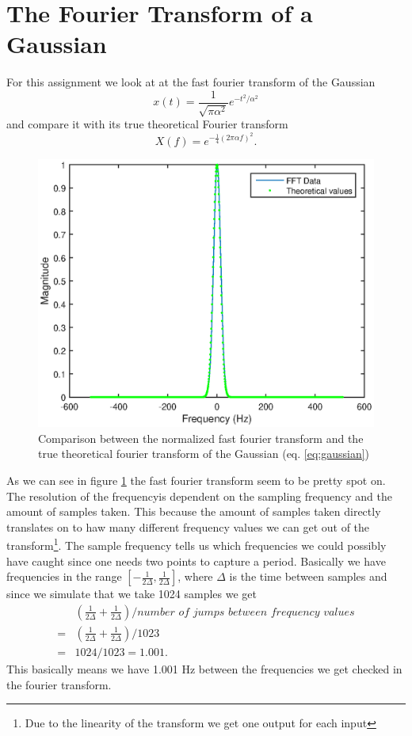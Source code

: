 \documentclass[11pt]{article}
\begin{document}
\section{The Fourier Transform of a Gaussian}
For this assignment we look at at the fast fourier transform of the Gaussian 
\begin{equation}
	x(t) = \frac{1}{\sqrt{\pi \alpha^2}} e^{-t^2/\alpha^2}
	\label{eq:gaussian}
\end{equation}
and compare it with its true theoretical Fourier transform
\begin{equation}
	X(f) = e^{-\frac{1}{4} (2 \pi \alpha f)^2}.
	\label{eq:guassianFFT}
\end{equation}
\begin{figure}[H]
	\centering
	\includegraphics[width=1\textwidth]{../ex1/gaussianFFT}
	\caption{Comparison between the normalized fast fourier transform and the true theoretical fourier transform of the Gaussian (eq. \ref{eq:gaussian})}
	\label{fig:gaussianFFT}
\end{figure}

As we can see in figure \ref{fig:gaussianFFT} the fast fourier transform seem to be pretty spot on. The resolution of the frequencyis dependent on the sampling frequency and the amount of samples taken. This because the amount of samples taken directly translates on to haw many different frequency values we can get out of the transform\footnote{Due to the linearity of the transform we get one output for each input}. The sample frequency tells us which frequencies we could possibly have caught since one needs two points to capture a period. Basically we have frequencies in the range $[-\frac{1}{2 \Delta},\frac{1}{2 \Delta}]$, where $\Delta$ is the time between samples and since we simulate that we take 1024 samples we get 
\begin{align}
	&(\frac{1}{2 \Delta} +\frac{1}{2 \Delta})/\textit{number of jumps between frequency values} \\ 
	=& (\frac{1}{2\Delta} +\frac{1}{2\Delta})/1023\\
	=& 1024/1023 = 1.001.
\end{align}
This basically means we have 1.001 Hz between the frequencies we get checked in the fourier transform.
\end{document}
